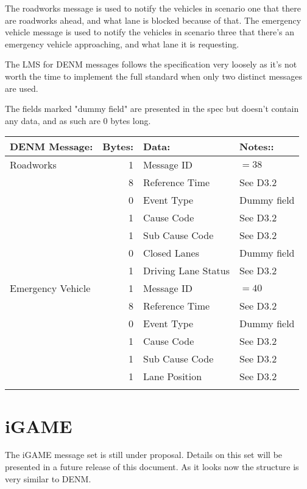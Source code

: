 \documentclass[11pt]{article}
\begin{document}
The roadworks message is used to notify the vehicles in scenario one that
there are roadworks ahead, and what lane is blocked because of that.
The emergency vehicle message is used to notify the vehicles in scenario three
that there's an emergency vehicle approaching, and what lane it is
requesting.

The LMS for DENM messages follows the specification very loosely as
it's not worth the time to implement the full standard when only two
distinct messages are used. 

The fields marked "dummy field" are presented in the spec but doesn't
contain any data, and as such are 0 bytes long.

\begin{center}
\begin{tabular}{lrll}
\hline
DENM Message: & Bytes: & Data: & Notes::\\
\hline
Roadworks & 1 & Message ID & \(=38\)\\
 & 8 & Reference Time & See D3.2\\
 & 0 & Event Type & Dummy field\\
 & 1 & Cause Code & See D3.2\\
 & 1 & Sub Cause Code & See D3.2\\
 & 0 & Closed Lanes & Dummy field\\
 & 1 & Driving Lane Status & See D3.2\\
\hline
Emergency Vehicle & 1 & Message ID & \(=40\)\\
 & 8 & Reference Time & See D3.2\\
 & 0 & Event Type & Dummy field\\
 & 1 & Cause Code & See D3.2\\
 & 1 & Sub Cause Code & See D3.2\\
 & 1 & Lane Position & See D3.2\\
 &  &  & \\
\end{tabular}
\end{center}


\newpage
\section{iGAME}
\label{sec:orgheadline4}
The iGAME message set is still under proposal. Details on this set
will be presented in a future release of this document. As it looks
now the structure is very similar to DENM.
\end{document}
